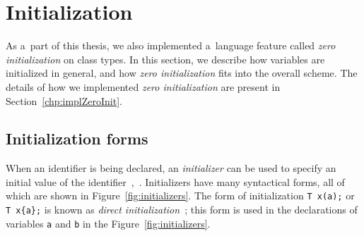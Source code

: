 \documentclass[nolot,nolof,nocover,printed]{fithesis3}
\newcommand{\stdN}[2]{\cite[#2]{#1}\xspace}
\begin{document}
%
%
%
%


\section{Initialization} \label{chap:lang:init}
As a~part of this thesis, we also implemented a~language feature called \textit{zero initialization} on class types. In this section, we describe how variables are initialized in general, and how \textit{zero initialization} fits into the overall scheme. The details of how we implemented \textit{zero initialization} are present in Section~\ref{chp:implZeroInit}.

\subsection{Initialization forms}
When an identifier is being declared, an \textit{initializer} can be used to specify an initial value of the identifier~\stdN{n4296}{\S 8.5/1},~\stdN{n4700}{\S 11.6/1}. Initializers have many syntactical forms, all of which are shown in Figure~\ref{fig:initializers}. The form of initialization \lstinline|T x(a);| or \lstinline|T x{a};| is known as \textit{direct initialization}~\stdN{n4296}{\S 8.5/16}; this form is used in the declarations of variables \lstinline|a| and \lstinline|b| in the Figure~\ref{fig:initializers}.
\end{document}
